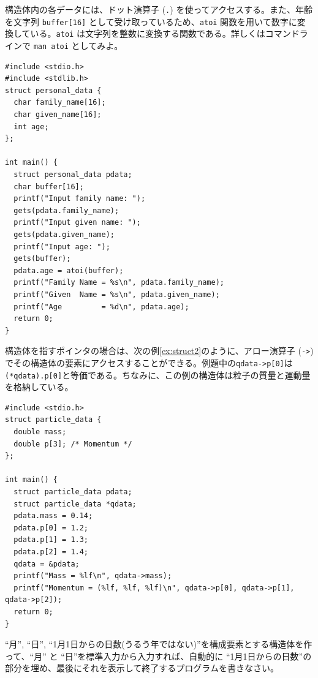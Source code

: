構造体内の各データには、ドット演算子 (\verb|.|) を使ってアクセスする。また、年齢を文字列 \verb|buffer[16]| として受け取っているため、\verb|atoi| 関数を用いて数字に変換している。\verb|atoi| は文字列を整数に変換する関数である。詳しくはコマンドラインで \verb|man atoi| としてみよ。
%
\begin{reidai}\label{ex:struct1}
\begin{verbatim}
#include <stdio.h>
#include <stdlib.h>
struct personal_data {
  char family_name[16];
  char given_name[16];
  int age;
};

int main() {
  struct personal_data pdata;
  char buffer[16];
  printf("Input family name: ");
  gets(pdata.family_name);
  printf("Input given name: ");
  gets(pdata.given_name);
  printf("Input age: ");
  gets(buffer);
  pdata.age = atoi(buffer);
  printf("Family Name = %s\n", pdata.family_name);
  printf("Given  Name = %s\n", pdata.given_name);
  printf("Age         = %d\n", pdata.age);
  return 0;
}
\end{verbatim}
\end{reidai} \noindent
%
構造体を指すポインタの場合は、次の例\ref{ex:struct2}のように、アロー演算子 (\verb|->|) でその構造体の要素にアクセスすることができる。例題中の\verb|qdata->p[0]|は\verb|(*qdata).p[0]|と等価である。ちなみに、この例の構造体は粒子の質量と運動量を格納している。
%
\begin{reidai}\label{ex:struct2}
\begin{verbatim}
#include <stdio.h>
struct particle_data {
  double mass;
  double p[3]; /* Momentum */
};

int main() {
  struct particle_data pdata;
  struct particle_data *qdata;
  pdata.mass = 0.14;
  pdata.p[0] = 1.2;
  pdata.p[1] = 1.3;
  pdata.p[2] = 1.4;
  qdata = &pdata;
  printf("Mass = %lf\n", qdata->mass);
  printf("Momentum = (%lf, %lf, %lf)\n", qdata->p[0], qdata->p[1], qdata->p[2]);
  return 0;
}
\end{verbatim}
\end{reidai}
%
\begin{renshuu}\label{prob:7-1}
``月'', ``日'', ``1月1日からの日数(うるう年ではない)''を構成要素とする構造体を作って、``月'' と ``日''を標準入力から入力すれば、自動的に ``1月1日からの日数''の部分を埋め、最後にそれを表示して終了するプログラムを書きなさい。
\end{renshuu}

